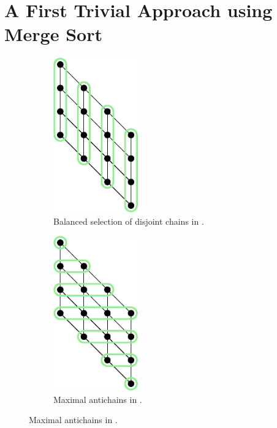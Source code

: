 \section{A First Trivial Approach using Merge Sort}

\begin{figure}
\centering
\begin{subfigure}[b]{0.49\textwidth}
\centering
	\includegraphics[width=0.4\textwidth]{fig/x+y/poset/chains}
	\caption{Balanced selection of disjoint chains in \XY.}
	\label{fig:xy:poset:chains}
\end{subfigure}
\begin{subfigure}[b]{0.49\textwidth}
\centering
	\includegraphics[width=0.4\textwidth]{fig/x+y/poset/antichains}
	\caption{Maximal antichains in \XY.}
	\label{fig:xy:poset:antichains}
\end{subfigure}
\end{figure}

